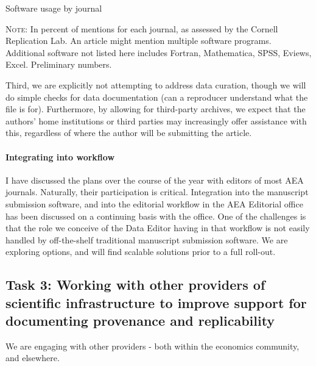 \documentclass[AEJ]{AEA}
\begin{document}
\begin{table}
	\caption{Software usage by journal\label{tab:software_by_journal}} 
	\small

\begin{minipage}{0.7\textwidth}
\textsc{Note:} In percent of mentions for each journal, as assessed by the Cornell Replication Lab. An article might mention multiple software programs. Additional software not listed here includes Fortran, Mathematica, SPSS, Eviews, Excel. Preliminary numbers. 
\end{minipage}
\end{table}


Third, we are explicitly not attempting to address data curation, though we will do simple checks for data documentation (can a reproducer understand what the file is for). Furthermore,  by allowing for third-party archives, we expect that the authors' home institutions or third parties may increasingly offer assistance with this, regardless of where the author will be submitting the article. 

\FloatBarrier
\paragraph{Integrating into workflow} I have discussed the plans over the course of the year with editors of most AEA journals. Naturally, their participation is critical. Integration into the manuscript submission software, and into the editorial workflow in the AEA Editorial office has been discussed on a continuing basis with the office. One of the challenges is that the role we conceive of the Data Editor having in that workflow is not easily handled by off-the-shelf traditional manuscript submission software. We are exploring options, and will find scalable solutions prior to a full roll-out. 

\subsection{Task 3: Working with other providers of scientific infrastructure to improve support for documenting provenance and replicability}
We are engaging with other providers - both within the economics community, and elsewhere. 
\end{document}
